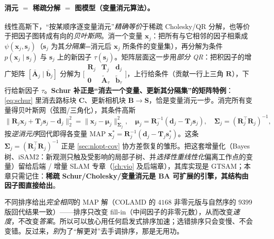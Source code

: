\paragraph{消元 $=$ 稀疏分解 $=$ 图模型（变量消元算法）。}\cite{dellaert2017factor,carlone2026handbook}
线性高斯下，“按某顺序逐变量消元”\emph{精确等价}于稀疏 Cholesky/QR 分解，也等价于把因子图转成有向的\emph{贝叶斯网}。消一个变量 $\mathbf{x}_j$：把所有与它相邻的因子相乘成 $\psi(\mathbf{x}_j,\mathbf{s}_j)$（$\mathbf{s}_j$ 为其\emph{分隔集}=消元后 $\mathbf{x}_j$ 所条件的变量集），再分解为条件 $p(\mathbf{x}_j\mid\mathbf{s}_j)$ 与 $\mathbf{s}_j$ 上的新因子 $\tau(\mathbf{s}_j)$。矩阵层面这一步用\emph{部分 QR}：把积因子的增广矩阵 $[\bar{\mathbf{A}}_j\mid\bar{\mathbf{b}}_j]$ 分解为 $\big[\begin{smallmatrix}\mathbf{R}_j&\mathbf{T}_j&\mathbf{d}_j\\\mathbf{0}&\tilde{\mathbf{A}}_\tau&\tilde{\mathbf{b}}_\tau\end{smallmatrix}\big]$，上行给条件（贡献一行上三角 $\mathbf{R}$），下行给新因子 $\tau$。\textbf{Schur 补正是“消去一个变量、更新其分隔集”的矩阵特例}：\cref{eq:schur} 里消去路标块 $\mathbf{C}$、更新相机块 $\mathbf{B}\to\mathbf{S}$，恰是变量消元一步。消完所有变量得贝叶斯网（弦图/三角化），其条件高斯
\begin{equation}
  \|\mathbf{R}_j\mathbf{x}_j+\mathbf{T}_j\mathbf{s}_j-\mathbf{d}_j\|_2^2=\|\mathbf{x}_j-\boldsymbol{\mu}_j\|_{\boldsymbol{\Sigma}_j}^2,\quad
  \boldsymbol{\mu}_j=\mathbf{R}_j^{-1}(\mathbf{d}_j-\mathbf{T}_j\mathbf{s}_j),\quad \boldsymbol{\Sigma}_j=(\mathbf{R}_j^\top\mathbf{R}_j)^{-1},
  \label{eq:nlopt-elim-cond}
\end{equation}
按\emph{逆消元序}回代即得各变量 MAP $\mathbf{x}_j^*=\mathbf{R}_j^{-1}(\mathbf{d}_j-\mathbf{T}_j\mathbf{s}_j^*)$。这条 $\boldsymbol{\Sigma}_j=(\mathbf{R}_j^\top\mathbf{R}_j)^{-1}$ 正是 \cref{sec:nlopt-cov} 协方差恢复的雏形。把这套增量化（Bayes 树、iSAM2：新观测只触及受影响的局部子树、并\emph{选择性重线性化}偏离工作点的变量）留给后端 / 增量 SLAM 专章（\cref{ch:vio} 及后端章），其库实现是 GTSAM\cite{dellaert2017factor}；本章只需记住：\textbf{稀疏 Schur/Cholesky/变量消元是 BA 可扩展的引擎，其结构由因子图直接给出}。

\begin{pitfall}
不同排序给出\emph{完全相同}的 MAP 解（COLAMD 的 $4168$ 非零元版与自然序的 $9399$ 版回代结果一致）——排序只改变 fill-in（中间因子的非零元数），从而改变\emph{速度}，不改变\emph{答案}。所以可以放心用任何启发式排序加速；选错排序只会变慢、不会变错。反过来，\emph{别}为了“解更对”去手调排序，那是无用功。
\end{pitfall}

